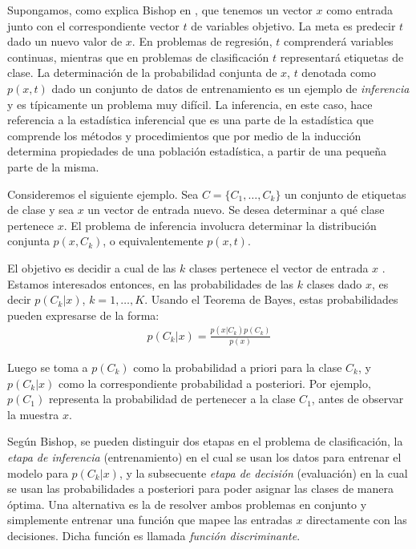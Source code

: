 	Supongamos, como explica Bishop en \cite{Bis07}, que tenemos un vector $x$ como entrada junto con el correspondiente vector $t$ de variables objetivo. La meta es predecir $t$ dado un nuevo valor de $x$. En problemas de regresión, $t$ comprenderá variables continuas, mientras que en problemas de clasificación $t$ representará etiquetas de clase. La determinación de la probabilidad conjunta de $x$, $t$ denotada como $p(x,t)$ dado un conjunto de datos de entrenamiento es un ejemplo de \textit{inferencia} y es típicamente un problema muy difícil. La inferencia, en este caso, hace referencia a la estadística inferencial que es una parte de la estadística que comprende los métodos y procedimientos que por medio de la inducción determina propiedades de una población estadística, a partir de una pequeña parte de la misma.
	
	Consideremos el siguiente ejemplo. Sea $C=\{C_1,\dots,C_k\}$ un conjunto de etiquetas de clase y sea $x$ un vector de entrada nuevo. Se desea determinar a qué clase pertenece $x$. El problema de inferencia involucra determinar la distribución conjunta $p(x,C_k)$, o equivalentemente $p(x,t)$.

	El objetivo es decidir a cual de las $k$ clases pertenece el vector de entrada $x$ . Estamos interesados entonces, en las probabilidades de las $k$ clases dado $x$, es decir $p(C_k|x)$, $k=1,\dots,K$. Usando el Teorema de Bayes, estas probabilidades pueden expresarse de la forma:
		\begin{align*}
			p(C_k|x) = \frac{p(x|C_k)p(C_k)}{p(x)}
		\end{align*}

	Luego se toma a $p(C_k)$ como la probabilidad a priori para la clase $C_k$, y $p(C_k|x)$ como la correspondiente probabilidad a posteriori. Por ejemplo, $p(C_1)$ representa la probabilidad de pertenecer a la clase $C_1$, antes de observar la muestra $x$.
	
	Según Bishop, se pueden distinguir dos etapas en el problema de clasificación, la \textit{etapa de inferencia} (entrenamiento) en el cual se usan los datos para entrenar el modelo para $p(C_k|x)$, y la subsecuente \textit{etapa de decisión} (evaluación) en la cual se usan las probabilidades a posteriori para poder asignar las clases de manera óptima. Una alternativa es la de resolver ambos problemas en conjunto y simplemente entrenar una función que mapee las entradas $x$ directamente con las decisiones. Dicha función es llamada \textit{función discriminante}.
	
